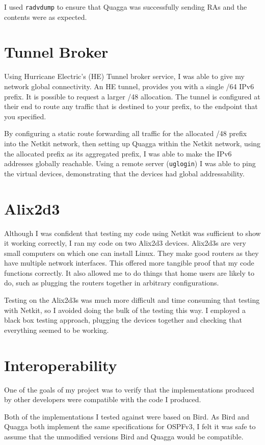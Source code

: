 \documentclass[12pt,a4paper,twoside]{report}
\begin{document}
I used \texttt{radvdump} to ensure that Quagga was successfully sending RAs and
the contents were as expected. 

\section{Tunnel Broker}
Using Hurricane Electric's (HE) Tunnel broker service, I was able to give my
network global connectivity. An HE tunnel, provides you with a single /64 IPv6
prefix. It is possible to request a larger /48 allocation. The tunnel is
configured at their end to route any traffic that is destined to your prefix,
to the endpoint that you specified.  

By configuring a static route forwarding all traffic for the allocated /48
prefix into the Netkit network, then setting up Quagga within the Netkit
network, using the allocated prefix as its aggregated prefix, I was able to
make the IPv6 addresses globally reachable. Using a remote server
(\texttt{uglogin}) I was able to ping the virtual devices, demonstrating that
the devices had global addressability.

\section{Alix2d3}
\label{alix}
Although I was confident that testing my code using Netkit was sufficient to
show it working correctly, I ran my code on two Alix2d3 devices. Alix2d3s are
very small computers on which one can install Linux. They make good routers as
they have multiple network interfaces. This offered more tangible proof
that my code functions correctly. It also allowed me to do things that home
users are likely to do, such as plugging the routers together in arbitrary
configurations.

Testing on the Alix2d3s was much more difficult and time consuming that testing
with Netkit, so I avoided doing the bulk of the testing this way. I employed a
black box testing approach, plugging the devices together and checking that
everything seemed to be working. 

\section{Interoperability}
One of the goals of my project was to verify that the implementations produced
by other developers were compatible with the code I produced. 

Both of the implementations I tested against were based on Bird. As Bird and
Quagga both implement the same specifications for OSPFv3, I felt it was safe to
assume that the unmodified versions Bird and Quagga would be compatible. 
\end{document}
